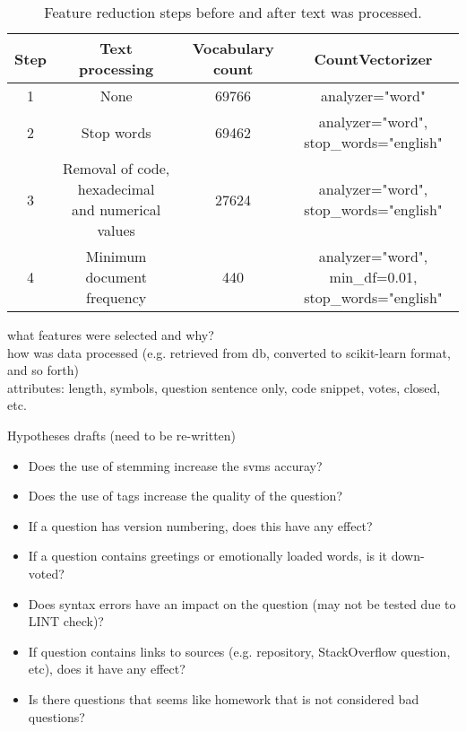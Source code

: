 \begin{table}[tbp]
	\centering
	\begin{tabular}{| c | c | c | c |}
		\hline
		Step & Text processing  & Vocabulary count & CountVectorizer  \\ \hline
		1 	& None 									& 69766 	& analyzer="word" \\ \hline
		2 	& Stop words 							& 69462 	& 
			\shortstack{analyzer="word", \\ stop\_words="english"} \\ \hline
		3 	& \shortstack{Removal of code, 
			hexadecimal \\ and numerical values} 	& 27624 	& 
			\shortstack{analyzer="word", \\ stop\_words="english"} \\ \hline
		4 	& Minimum document frequency 			& 440 		& 
				\shortstack{analyzer="word", min\_df=0.01, \\ stop\_words="english"} \\ \hline
	\end{tabular}
	\caption{Feature reduction steps before and after text was processed.}
	\label{tab:feature_reduction}
\end{table}

what features were selected and why? \\
how was data processed (e.g. retrieved from db, converted to scikit-learn format, and so forth) \\
attributes: length, symbols, question sentence only, code snippet, votes, closed, etc.

\newpage
Hypotheses drafts (need to be re-written)
\begin{itemize}
	\item Does the use of stemming increase the \gls{svm}s accuray?
	\item Does the use of tags increase the quality of the question?
	\item If a question has version numbering, does this have any effect?
	\item If a question contains greetings  or emotionally loaded words, is it down-voted?
	\item Does syntax errors have an impact on the question (may not be tested due to LINT check)?
	\item If question contains links to sources (e.g. repository, StackOverflow question, etc), does it have any effect?
	\item Is there questions that seems like homework that is not considered bad questions?
\end{itemize}
